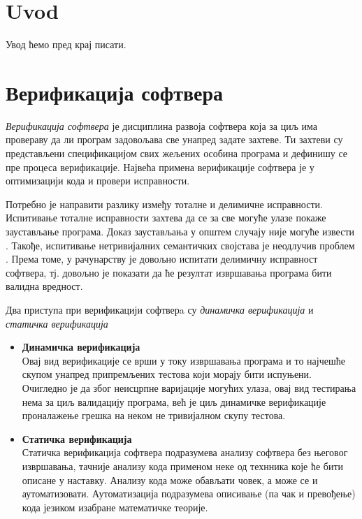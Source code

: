 \documentclass[a4paper]{article}
\begin{document}
{\tableofcontents

\newpage

\section{Uvod}
Увод ћемо пред крај писати.

\section{Верификација софтвера}

\emph{Верификација софтвера} је дисциплина развоја софтвера која за циљ има провераву да ли програм задовољава све унапред задате захтеве. Ти захтеви су представљени спецификацијом свих жељених особина програма и дефинишу се пре процеса верификације. Највећа примена верификације софтвера је у оптимизацији кода и провери исправности.


Потребно је направити разлику између тоталне и делимичне исправности. Испитивање тоталне исправности захтева да се за све могуће улазе покаже заустављање програма. Доказ заустављања у општем случају није могуће извести \cite{turing}. Такође, испитивање нетривијалних семантичких својстава је неодлучив проблем \cite{rice}. Према томе, у рачунарству је довољно испитати делимичну исправност софтвера, тј. довољно је показати да ће резултат извршавања програма бити валидна вредност.


Два приступа при верификацији софтверa су \emph{динамичка верификација} и \emph{статичка верификација} \cite{milena} 
\begin{itemize}
\item \textbf{Динамичка верификација}\\
Овај вид верификације се врши у току извршавања програма и то најчешће скупом 
унапред припремљених тестова који морају бити испуњени. Очигледно је да због неисцрпне варијације могућих улаза, овај вид тестирања нема за циљ валидацију програма, већ је циљ динамичке верификације проналажење грешка на неком не тривијалном скупу тестова.
\item \textbf{Статичка верификација}\\
Статичка верификација софтвера подразумева анализу софтвера без његовог извршавања, тачније анализу кода применом неке од технника које ће бити описане у наставку. Анализу кода може обављати човек, а може се и аутоматизовати. Аутоматизација подразумева описивање (па чак и превођење) кода језиком изабране математичке теорије.
\end{itemize}


}
\end{document}
